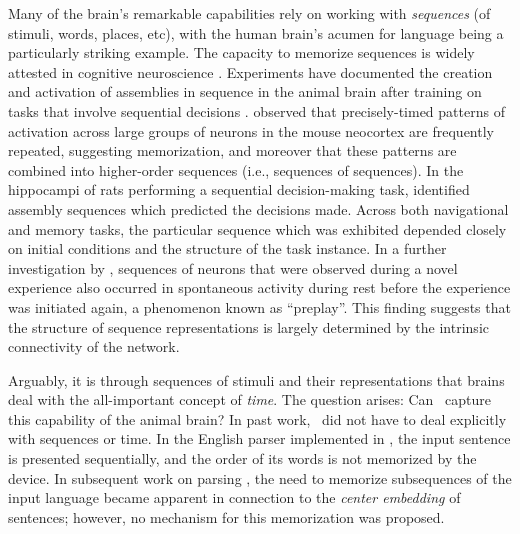 \documentclass[12pt,nosubfloats]{alt2024} %
\newcommand{\1}{\mathbbm{1}}
\begin{document}
Many of the brain's remarkable capabilities rely on working with {\em sequences} (of stimuli, words, places, etc), with the human brain's acumen for language being a particularly striking example. The capacity to memorize sequences is widely attested in cognitive neuroscience \citep{sugar2019episodic, bellmund2020sequence}. Experiments have documented the creation and activation of assemblies in sequence in the animal brain after training on tasks that involve sequential decisions \citep{dragoi2006temporal, pastalkova2008internally, dragoi2011preplay}. \citet{ikegaya2004synfire} observed that precisely-timed patterns of activation across large groups of neurons in the mouse neocortex are frequently repeated, suggesting memorization, and moreover that these patterns are combined into higher-order sequences (i.e., sequences of sequences). In the hippocampi of rats performing a sequential decision-making task, \citet{pastalkova2008internally} identified assembly sequences which predicted the decisions made. Across both navigational and memory tasks, the particular sequence which was exhibited depended closely on initial conditions and the structure of the task instance. In a further investigation by \citet{dragoi2011preplay}, sequences of neurons that were observed during a novel experience also occurred in spontaneous activity during rest before the experience was initiated again, a phenomenon known as ``preplay''. This finding suggests that the structure of sequence representations is largely determined by the intrinsic connectivity of the network.  

Arguably, it is through sequences of stimuli and their representations that brains deal with the all-important concept of {\em time}.  The question arises: Can \name\  capture this capability of the animal brain?   In past work, \name\  did not have to deal explicitly with sequences or time. In the English parser implemented in \cite{mitropolsky2021biologically}, the input sentence is presented sequentially, and the order of its words is not memorized by the device.  In subsequent work on parsing \cite{mitropolsky2022center}, the need to memorize subsequences of the input language became apparent in connection to the {\em center embedding} of sentences; however, no mechanism for this memorization was proposed.
\end{document}
